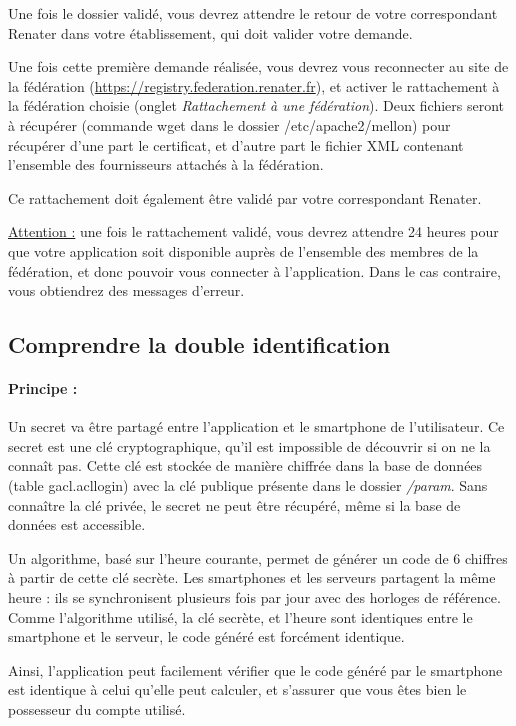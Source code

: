 Une fois le dossier validé, vous devrez attendre le retour de votre correspondant Renater dans votre établissement, qui doit valider votre demande.

Une fois cette première demande réalisée, vous devrez vous reconnecter au site de la fédération (\href{https://registry.federation.renater.fr}{https://registry.federation.renater.fr}), et activer le rattachement à la fédération choisie (onglet \textit{Rattachement à une fédération}). Deux fichiers seront à récupérer (commande wget dans le dossier /etc/apache2/mellon) pour récupérer d'une part le certificat, et d'autre part le fichier XML contenant l'ensemble des fournisseurs attachés à la fédération.

Ce rattachement doit également être validé par votre correspondant Renater.

\underline{Attention :} une fois le rattachement validé, vous devrez attendre 24 heures pour que votre application soit disponible auprès de l'ensemble des membres de la fédération, et donc pouvoir vous connecter à l'application. Dans le cas contraire, vous obtiendrez des messages d'erreur.
 
\subsection{Comprendre la double identification}

\paragraph{Principe :}

Un secret va être partagé entre l'application et le smartphone de l'utilisateur. Ce secret est une clé cryptographique, qu'il est impossible de découvrir si on ne la connaît pas. Cette clé est stockée de manière chiffrée dans la base de données (table gacl.acllogin) avec la clé publique présente dans le dossier \textit{/param}. Sans connaître la clé privée, le secret ne peut être récupéré, même si la base de données est accessible.

Un algorithme, basé sur l'heure courante, permet de générer un code de 6 chiffres à partir de cette clé secrète. Les smartphones et les serveurs partagent la même heure : ils se synchronisent plusieurs fois par jour avec des horloges de référence. Comme l'algorithme utilisé, la clé secrète, et l'heure sont identiques entre le smartphone et le serveur, le code généré est forcément identique. 

Ainsi, l'application peut facilement vérifier que le code généré par le smartphone est identique à celui qu'elle peut calculer, et s'assurer que vous êtes bien le possesseur du compte utilisé.

